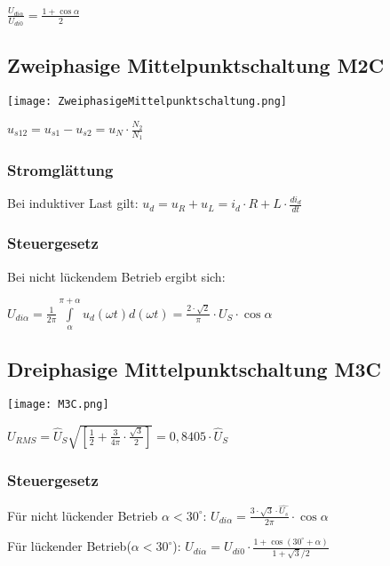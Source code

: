 \documentclass[german]{latex4ei/latex4ei_sheet}
\begin{document}
\begin{sectionbox}
					$\frac{U_{di\alpha}}{U_{di0}} = \frac{1+\cos \alpha}{2}$

		\subsection{Zweiphasige Mittelpunktschaltung M2C}
			\texttt{[image: ZweiphasigeMittelpunktschaltung.png]}

			$u_{s12} = u_{s1}-u_{s2} = u_N \cdot \frac{N_2}{N_1}$
			\subsubsection{Stromglättung}
				Bei induktiver Last gilt: $u_d = u_R + u_L = i_d\cdot R+L\cdot \frac{di_d}{dt}$
			\subsubsection{Steuergesetz}
				Bei nicht lückendem Betrieb ergibt sich:

				$U_{di\alpha} = \frac{1}{2\pi}\int\limits_\alpha^{\pi+\alpha}u_d(\omega t)d(\omega  t) = \frac{2\cdot \sqrt{2}}{\pi}\cdot U_S \cdot \cos \alpha$
		\subsection{Dreiphasige Mittelpunktschaltung M3C}
			\texttt{[image: M3C.png]}

			$U_{RMS} = \hat{U}_S \sqrt{\left[ \frac{1}{2}+\frac{3}{4\pi}\cdot \frac{\sqrt{3}}{2}\right]} = 0,8405\cdot \hat{U}_S$
			\subsubsection{Steuergesetz}
			Für nicht lückender Betrieb $\alpha < 30^\circ$: $U_{di\alpha} = \frac{3\cdot \sqrt{3}\cdot \hat{U_s}}{2\pi}\cdot \cos \alpha$

			Für lückender Betrieb($\alpha < 30^\circ$): $U_{di\alpha} = U_{di0}\cdot \frac{1+\cos(30^\circ + \alpha)}{1+\sqrt{3}/2}$

	\end{sectionbox}
\end{document}

